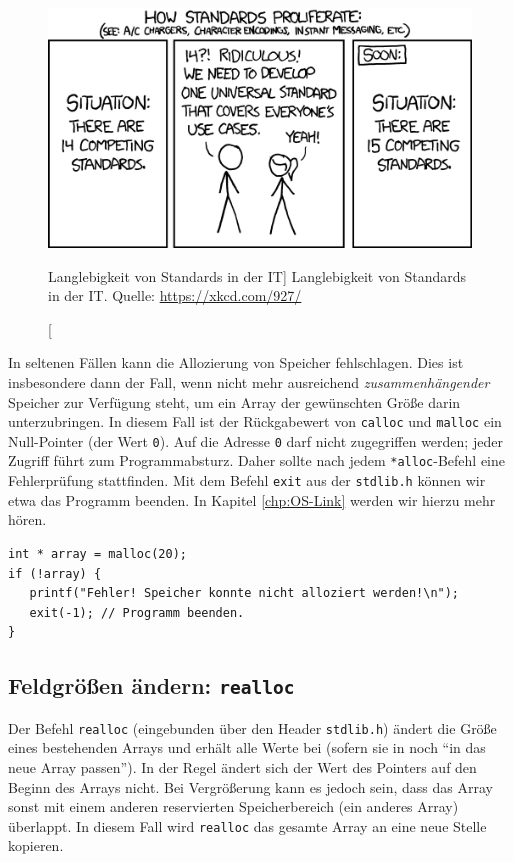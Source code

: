 \begin{figure}
\begin{center}
\includegraphics[width=.8\linewidth]{./gfx/xkcd-standards}
\caption
[Langlebigkeit von Standards in der IT]
{Langlebigkeit von Standards in der IT. Quelle: \url{https://xkcd.com/927/}} \label{fig:xkcd-standards}
\end{center}
\end{figure}

\begin{warnbox}
In seltenen Fällen kann die Allozierung von Speicher fehlschlagen. Dies ist insbesondere dann der Fall, wenn nicht mehr ausreichend \emph{zusammenhängender} Speicher zur Verfügung steht, um ein Array der gewünschten Größe darin unterzubringen. In diesem Fall ist der Rückgabewert von \texttt{calloc} und \texttt{malloc} ein Null-Pointer (\ie der Wert \texttt{0}). Auf die Adresse \texttt{0} darf nicht zugegriffen werden; jeder Zugriff führt zum Programmabsturz. Daher sollte nach jedem \texttt{*alloc}-Befehl eine Fehlerprüfung stattfinden. Mit dem Befehl \texttt{exit} aus der \texttt{stdlib.h} können wir etwa das Programm beenden. In Kapitel \ref{chp:OS-Link} werden wir hierzu mehr hören.

\begin{codebox}
\begin{verbatim}
int * array = malloc(20);
if (!array) {
   printf("Fehler! Speicher konnte nicht alloziert werden!\n");
   exit(-1); // Programm beenden.
}
\end{verbatim}
\end{codebox}
\end{warnbox}

\subsection{Feldgrößen ändern: \texttt{realloc}} \label{sec:realloc}
Der Befehl \texttt{realloc} (eingebunden über den Header \texttt{stdlib.h}) ändert die Größe eines bestehenden Arrays und erhält alle Werte bei (sofern sie in noch \enquote{in das neue Array passen}). In der Regel ändert sich der Wert des Pointers auf den Beginn des Arrays nicht. Bei Vergrößerung kann es jedoch sein, dass das Array sonst mit einem anderen reservierten Speicherbereich (\eg ein anderes Array) überlappt. In diesem Fall wird \texttt{realloc} das gesamte Array an eine neue Stelle kopieren.

